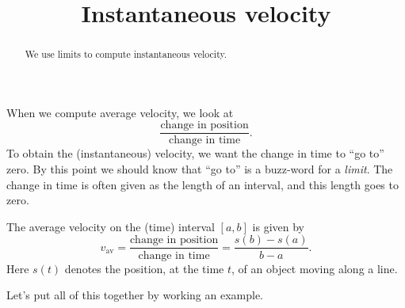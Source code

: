 \documentclass{ximera}
\title[Dig-In:]{Instantaneous velocity}
\begin{document}
\begin{abstract}
We use limits to compute instantaneous velocity.
\end{abstract}
\maketitle

When we compute average velocity, we look at 
\[
\frac{\text{change in position}}{\text{change in time}}.
\]
To obtain the (instantaneous) velocity, we want the change in time to
``go to'' zero. By this point we should know that ``go to'' is a
buzz-word for a \emph{limit}. The change in time is often given as
the length of an interval, and this length goes to zero.

The average velocity on the (time) interval $[a,b]$ is given by
\[
v_{\text{av}} = 
\frac{\text{change in position}}{\text{change in time}} =
\frac{s(b)-s(a)}{b-a}.
\]
Here $s(t)$ denotes the position, at the time $t$, of an object moving along a line.

Let's put all of this together by working an example.
\end{document}
